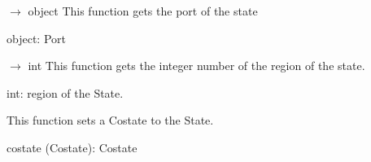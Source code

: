 \documentclass[letterpaper,10pt,english]{sphinxmanual}
\begin{document}
\begin{fulllineitems}
\begin{fulllineitems}
\end{fulllineitems}


\begin{fulllineitems}
\label{\detokenize{scrimp:scrimp.state.State.get_port}}
\pysigstartsignatures
\pysiglinewithargsret
{}
{}
{{ $\rightarrow$ object}}
\pysigstopsignatures
\sphinxAtStartPar
This function gets the port of the state
\begin{description}
\sphinxAtStartPar
object: Port

\end{description}

\end{fulllineitems}


\begin{fulllineitems}
\label{\detokenize{scrimp:scrimp.state.State.get_region}}
\pysigstartsignatures
\pysiglinewithargsret
{}
{}
{{ $\rightarrow$ int}}
\pysigstopsignatures
\sphinxAtStartPar
This function gets the integer number of the region of the state.
\begin{description}
\sphinxAtStartPar
int: region of the State.

\end{description}

\end{fulllineitems}


\begin{fulllineitems}
\label{\detokenize{scrimp:scrimp.state.State.set_costate}}
\pysigstartsignatures
\pysiglinewithargsret
{}
{}
{}
\pysigstopsignatures
\sphinxAtStartPar
This function sets a Co\sphinxhyphen{}state to the State.
\begin{description}
\sphinxAtStartPar
costate (Costate): Co\sphinxhyphen{}state

\end{description}


\end{fulllineitems}
\end{fulllineitems}
\end{document}

